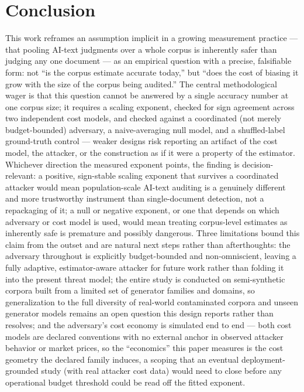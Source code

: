 \documentclass[11pt]{article}
\begin{document}
\section{Conclusion}

This work reframes an assumption implicit in a growing measurement practice --- that pooling AI-text judgments over a whole corpus is inherently safer than judging any one document --- as an empirical question with a precise, falsifiable form: not ``is the corpus estimate accurate today,'' but ``does the cost of biasing it grow with the size of the corpus being audited.'' The central methodological wager is that this question cannot be answered by a single accuracy number at one corpus size; it requires a scaling exponent, checked for sign agreement across two independent cost models, and checked against a coordinated (not merely budget-bounded) adversary, a naive-averaging null model, and a shuffled-label ground-truth control --- weaker designs risk reporting an artifact of the cost model, the attacker, or the construction as if it were a property of the estimator. Whichever direction the measured exponent points, the finding is decision-relevant: a positive, sign-stable scaling exponent that survives a coordinated attacker would mean population-scale AI-text auditing is a genuinely different and more trustworthy instrument than single-document detection, not a repackaging of it; a null or negative exponent, or one that depends on which adversary or cost model is used, would mean treating corpus-level estimates as inherently safe is premature and possibly dangerous. Three limitations bound this claim from the outset and are natural next steps rather than afterthoughts: the adversary throughout is explicitly budget-bounded and non-omniscient, leaving a fully adaptive, estimator-aware attacker for future work rather than folding it into the present threat model; the entire study is conducted on semi-synthetic corpora built from a limited set of generator families and domains, so generalization to the full diversity of real-world contaminated corpora and unseen generator models remains an open question this design reports rather than resolves; and the adversary's cost economy is simulated end to end --- both cost models are declared conventions with no external anchor in observed attacker behavior or market prices, so the ``economics'' this paper measures is the cost geometry the declared family induces, a scoping that an eventual deployment-grounded study (with real attacker cost data) would need to close before any operational budget threshold could be read off the fitted exponent.
\end{document}
